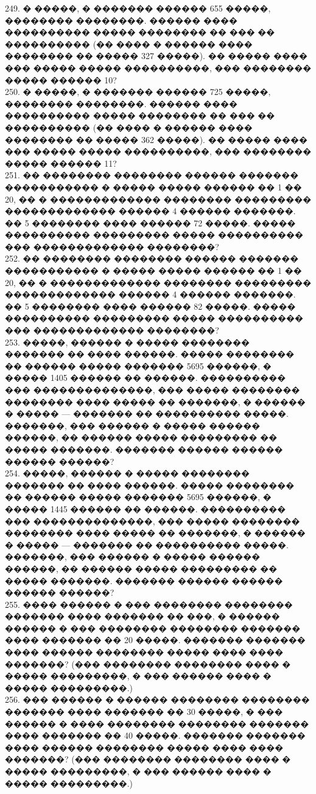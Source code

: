 \documentclass[12pt]{article}
\begin{document}
249. � �����, � ������� ������ 655 �����, �������� ��������. ������ ���� ���������� ����� �������� �� ��� �� ���������� (�� ���� � ������ ���� �������� �� ����� 327 �����). �� ����� ���� ��� ����� ����� ����������, ��� �������� ����� ������ 10?\\
250. � �����, � ������� ������ 725 �����, �������� ��������. ������ ���� ���������� ����� �������� �� ��� �� ���������� (�� ���� � ������ ���� �������� �� ����� 362 �����). �� ����� ���� ��� ����� ����� ����������, ��� �������� ����� ������ 11?\\
251. �� �������� �������� ������ ������� ����������� � ����� ����� ������ �� 1 �� 20, �� � ������������� �������� ��������� ������������� ������ 4 ������ �������. �� 5 �������� ���� ������ 72 �����. ����� ���������� ��������� ����� ���������� ��� ������������� ��������?\\
252. �� �������� �������� ������ ������� ����������� � ����� ����� ������ �� 1 �� 20, �� � ������������� �������� ��������� ������������� ������ 4 ������ �������. �� 5 �������� ���� ������ 82 �����. ����� ���������� ��������� ����� ���������� ��� ������������� ��������?\\
253. �����, ������ � ����� �������� ������� �� ���� ������. ����� �������� �� ������ ����� ������� 5695 ������, � ����� 1405 ������ �� ������. ���������� ��� ��������������, ��� ����� �������� �������� ���� ����� �� �������, � ������ � ����� --- ������� �� ���������� �����. �������, ��� ������ � ����� ������ ������, �� ������ ����� ��������� �� ����� �������. ������� ������ ������ ������ ������?\\
254. �����, ������ � ����� �������� ������� �� ���� ������. ����� �������� �� ������ ����� ������� 5695 ������, � ����� 1445 ������ �� ������. ���������� ��� ��������������, ��� ����� �������� �������� ���� ����� �� �������, � ������ � ����� --- ������� �� ���������� �����. �������, ��� ������ � ����� ������ ������, �� ������ ����� ��������� �� ����� �������. ������� ������ ������ ������ ������?\\
255. ���� ������ � ��� �������� �������� ������� ���� ������� �� ���, � ������ ������ � ��� �������� �������� ������� ���� ������� �� 20 �����. ������� ������� ���� ������ �������� ����� ���� ���� �������? (��� �������� �������� ���� � ����� ���������, � ��� ������ ���� � ����� ���������.)\\
256. ��� ������ � ������ �������� �������� ������� ���� ������� �� 30 �����, � ��� ������ � ���� �������� �������� ������� ���� ������� �� 40 �����. ������� ������� ���� ������ �������� ����� ���� ���� �������? (��� �������� �������� ���� � ����� ���������, � ��� ������ ���� � ����� ���������.)\\
\end{document}
